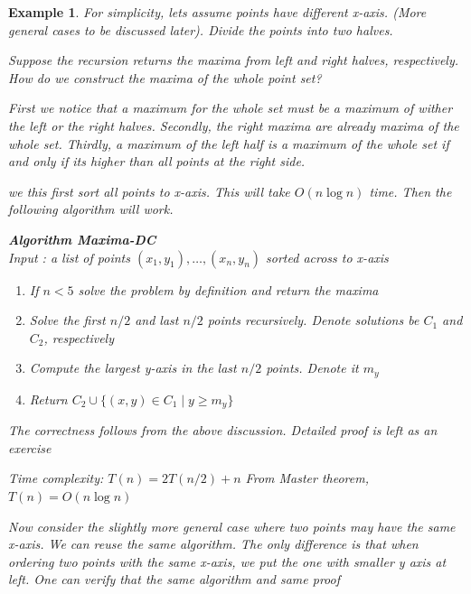 \documentclass[twoside]{article}
\newtheorem{ex}[theorem]{Example}
\begin{document}
\begin{ex}
For simplicity, lets assume points have different x-axis. (More general cases to be discussed later). Divide the points into two halves. 

Suppose the recursion returns the maxima from left and right halves, respectively. How do we construct the maxima of the whole point set?

First we notice that a maximum for the whole set must be a maximum of wither the left or the right halves. Secondly, the right maxima are already maxima of the whole set. Thirdly, a maximum of the left half is a maximum of the whole set if and only if its higher than all points at the right side. 

we this first sort all points to x-axis. This will take \(O(n \log n)\) time. Then the following algorithm will work. 

\textbf{Algorithm Maxima-DC}\\
Input : a list of points \((x_1, y_1), \ldots, (x_n, y_n)\) sorted across to x-axis

\begin{enumerate}
\item If \(n < 5\) solve the problem by definition and return the maxima 
\item Solve the first \(n/2\) and last \(n/2\) points recursively. Denote solutions be \(C_1\) and \(C_2\), respectively
\item Compute the largest y-axis in the last \(n/2\) points. Denote it \(m_y\)
\item Return \(C_2 \cup \{(x,y) \in C_1 \mid y \geq m_y\}\)
\end{enumerate}

The correctness follows from the above discussion. Detailed proof is left as an exercise  

Time complexity: \(T(n) = 2T(n/2) + n\) From Master theorem, \(T(n) = O(n \log n )\)

Now consider the slightly more general case where two points may have the same x-axis. We can reuse the same algorithm. The only difference is that when ordering two points with the same x-axis, we put the one with smaller y axis at left. 
One can verify that the same algorithm and same proof 
 
 
 
 \end{ex}
\end{document}
